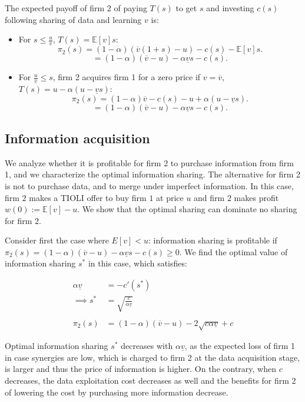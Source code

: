 \documentclass[a4paper,leqno]{article}%
\newcommand{\E}{\mathbb E}
\renewcommand{\a}{\alpha}
\newcommand{\uv}{\underline{v}}
\newcommand{\ov}{\overline{v}}
\begin{document}
The expected payoff of firm $2$ of paying $T(s)$ to get $s$ and investing $c(s)$ following sharing of data and learning $v$ is:

\begin{itemize}
    \item For $s\leq \frac{u}{\ov}$, $T(s)=\E[v]s$:
        $$\pi_2(s)=(1-\a)(\ov(1+s)-u)-c(s)-\E[v]s.$$
        $$=(1-\a)(\ov -u)-\a \uv s-c(s).$$

    \item For $\frac{u}{\ov}\leq s$, firm 2 acquires firm 1 for a zero price if $v=\ov$, $T(s)=u-\a(u-\uv s)$:
        $$\pi_2(s)=(1-\a)\ov-c(s)-u+\a(u-\uv s).$$
        $$=(1-\a)(\ov -u)-\a \uv s-c(s).$$
\end{itemize}

\medskip

\subsection{Information acquisition}\label{infacq}

We analyze whether it is profitable for firm 2 to purchase information from firm 1, and we characterize the optimal information sharing. The alternative for firm 2 is not to purchase data, and to merge under imperfect information. In this case, firm $2$ makes a TIOLI offer to buy firm $1$ at price $u$ and firm $2$ makes profit $w(0):=\E[v]-u$. We show that the optimal sharing can dominate no sharing for firm $2$. 

\medskip
Consider first the case where $E[v]<u$: information sharing is profitable if $\pi_2(s)=(1-\a)(\ov -u)-\a \uv s-c(s)\geq0$. We find the optimal value of information sharing $s^*$ in this case, which satisfies:


\begin{equation}
    \begin{aligned}
      \a \uv &=-c'(s^*)\\
      \implies s^*&=\sqrt{\frac{c}{\a \uv}}\\
      \\
      \pi_2(s)&=(1-\a)(\ov -u)-2 \sqrt{c\a \uv}+c 
    \end{aligned}
\end{equation}

Optimal information sharing $s^*$ decreases with $\a \uv$, as the expected loss of firm 1 in case synergies are low, which is charged to firm 2 at the data acquisition stage, is larger and thus the price of information is higher. On the contrary, when $c$ decreases, the data exploitation cost decreases as well and the benefits for firm 2 of lowering the cost by purchasing more information decrease.
\end{document}
